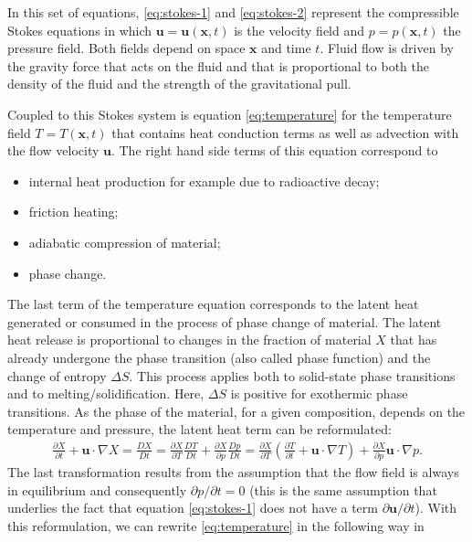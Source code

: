 \documentclass{article}
\begin{document}
In this set of equations, \eqref{eq:stokes-1} and \eqref{eq:stokes-2}
represent the compressible Stokes equations in which $\mathbf u=\mathbf
u(\mathbf x,t)$ is the velocity field and $p=p(\mathbf x,t)$ the pressure
field. Both fields depend on space $\mathbf x$ and time $t$. Fluid flow is
driven by the gravity force that acts on the fluid and that is proportional to
both the density of the fluid and the strength of the gravitational pull.

Coupled to this Stokes system is equation \eqref{eq:temperature} for the
temperature field $T=T(\mathbf x,t)$ that contains heat conduction terms as
well as advection with the flow velocity $\mathbf u$. The right hand side
terms of this equation correspond to
\begin{itemize}
\item internal heat production for example due to radioactive
  decay;
\item friction heating;
\item adiabatic compression of material;
\item phase change.
\end{itemize}
The last term of the temperature equation corresponds to
the latent heat generated or consumed in the process of phase change of material. The latent heat release
is proportional to changes in the fraction of material $X$ that has already
undergone the phase transition (also called phase function) and the change
of entropy $\Delta S$. This process applies both
to solid-state phase transitions and to melting/solidification.
Here, $\Delta S$ is positive for exothermic phase
transitions. As the phase of the material, for a given composition, depends
on the temperature and pressure, the latent heat term can be reformulated:
\begin{gather*}
\frac{\partial X}{\partial t} + \mathbf u\cdot\nabla X
=
\frac{DX}{Dt}
=
\frac{\partial X}{\partial T} \frac{DT}{Dt}
 + \frac{\partial X}{\partial p} \frac{Dp}{Dt}
=
\frac{\partial X}{\partial T}
\left(\frac{\partial T}{\partial t} + \mathbf u\cdot\nabla T
\right)
 + \frac{\partial X}{\partial p} \mathbf u\cdot\nabla p.
\end{gather*}
The last transformation results from the assumption that the flow field is
always in equilibrium and consequently $\partial p/\partial t=0$ (this is the
same assumption that underlies the fact that equation \eqref{eq:stokes-1}
does not have a term $\partial \mathbf u / \partial t$). With this
reformulation, we can rewrite \eqref{eq:temperature} in the following way in
\end{document}
